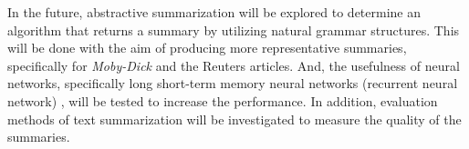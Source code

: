 \documentclass{article}[10]
\begin{document}
In the future, abstractive summarization will be explored to determine an algorithm that returns a summary by utilizing natural grammar structures. This will be done with the aim of producing more representative summaries, specifically for \textit{Moby-Dick} and the Reuters articles. And, the usefulness of neural networks, specifically long short-term memory neural networks (recurrent neural network) \cite{yao2014spoken}, will be tested to increase the performance. In addition, evaluation methods of text summarization will be investigated to measure the quality of the summaries.

\makeatletter
\renewenvironment{thebibliography}[1]
     {\section*{\refname}%
      \@mkboth{\MakeUppercase\refname}{\MakeUppercase\refname}%
      \list{\@biblabel{\@arabic\c@enumiv}}%
           {\settowidth\labelwidth{\@biblabel{#1}}%
            \setlength{\itemindent}{\dimexpr\labelwidth+\labelsep}
            \leftmargin\z@
            \@openbib@code
            \usecounter{enumiv}%
            \let\p@enumiv\@empty
            \renewcommand\theenumiv{\@arabic\c@enumiv}}%
      \sloppy
      \clubpenalty4000
      \@clubpenalty \clubpenalty
      \widowpenalty4000%
      \sfcode`\.\@m}
     {\def\@noitemerr
       {\@latex@warning{Empty `thebibliography' environment}}%
      \endlist}
\makeatother


\end{document}
